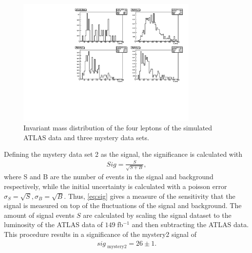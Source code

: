 \documentclass[twoside,        %
               BCOR12mm,       %
               ngerman,english, %
               fleqn,headsepline=false,footsepline=false
              ]{Vorlage/MFPREPORT}
\begin{document}
\begin{figure}[]
    \begin{center}
        \includegraphics[width=0.8\textwidth]{ZZ/mystery_mass_cut.pdf}
    \end{center}
    \caption{Invariant mass distribution of the four leptons of the simulated ATLAS data and three mystery data sets.}
    \label{fig:myst4}
\end{figure}

Defining the mystery data set 2 as the signal, the significance is calculated
with \cite{signifikanz}
\begin{align}
    \label{eq:sig}
    Sig=\frac{S}{\sqrt{S+B}},
\end{align}
where S and B are the number of events in the signal and background
respectively, while the initial uncertainty is calculated with a poisson error
$\sigma_S=\sqrt S, \sigma_B=\sqrt B$. Thus, \cref{eq:sig} gives a measure of
the sensitivity that the signal is measured on top of the fluctuations of the
signal and background. The amount of signal events $S$ are calculated by
scaling the signal dataset to the luminosity of the ATLAS data of
$149\;$fb$^{-1}$ and then subtracting the ATLAS data.
This procedure results in a significance of the mystery2 signal of
\begin{align}
    \label{eq:singance}
    sig_{\text{ mystery2}}=26\pm1.
\end{align}
\end{document}
